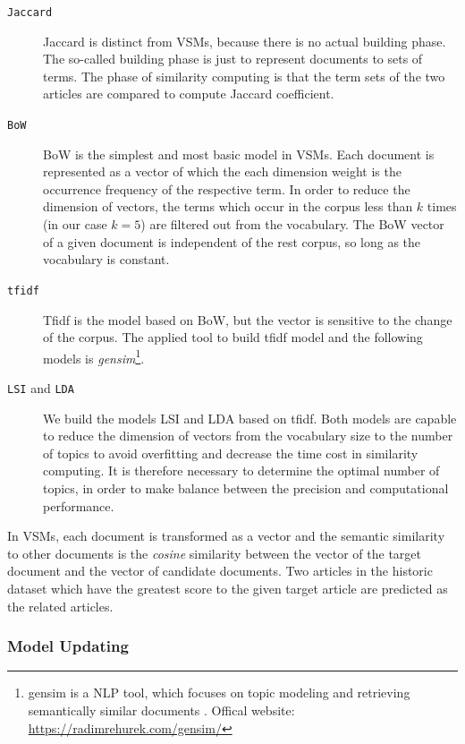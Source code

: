 \begin{description}
\item[\texttt{Jaccard}] Jaccard is distinct from VSMs, because there is no actual building phase. The so-called building phase is just to represent documents to sets of terms. The phase of similarity computing is that the term sets of the two articles are compared to compute Jaccard coefficient.  
\item[\texttt{BoW}] BoW is the simplest and most basic model in VSMs. Each document is represented as a vector of which the each dimension weight is the occurrence frequency of the respective term. In order to reduce the dimension of vectors, the terms which occur in the corpus less than $k$ times (in our case $k=5$) are filtered out from the vocabulary. The BoW vector of a given document is independent of the rest corpus, so long as the vocabulary is constant. 
\item[\texttt{tfidf}] Tfidf is the model based on BoW, but the vector is sensitive to the change of the corpus. The applied tool to build tfidf model and the following models is \textit{gensim}\footnote{gensim is a NLP tool, which focuses on topic modeling and retrieving semantically similar documents \cite{rehurek_lrec}. Offical website: \url{https://radimrehurek.com/gensim/}}.
\item[\texttt{LSI} and \texttt{LDA}] We build the models LSI and LDA based on tfidf. Both models are capable to reduce the dimension of vectors from the vocabulary size to the number of topics to avoid overfitting and decrease the time cost in similarity computing. It is therefore necessary to determine the optimal number of topics, in order to make balance between the precision and computational performance. 
\end{description}

In VSMs, each document is transformed as a vector and the semantic similarity to other documents is the \textit{cosine} similarity between the vector of the target document and the vector of candidate documents. Two articles in the historic dataset which have the greatest score to the given target article are predicted as the related articles. 

\subsubsection{Model Updating}


